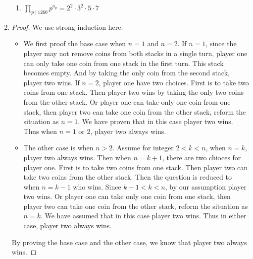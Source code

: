 \documentclass[11pt,a4paper]{article}
\begin{document}
\begin{enumerate}
\begin{enumerate}
			\item \( \prod\limits_{p \mid 1260} p^{a_{p}} = 2^2 \cdot 3^2 \cdot 5 \cdot 7\)
	 	\end{enumerate}

	\item \begin{proof} We use strong induction here.
		\begin{itemize}
			\item We first proof the base case when $n=1$ and $n=2$. If $n=1$, since the player may not remove coins from both stacks in a single turn, player one can only take one coin from one stack in the first turn. This stack becomes empty. And by taking the only coin from the second stack, player two wins. If $n=2$, player one have two choices. First is to take two coins from one stack. Then player two wins by taking the only two coins from the other stack. Or player one can take only one coin from one stack, then player two can take one coin from the other stack, reform the situation as $n=1$. We have proven that in this case player two wins. Thus when $n=1$ or $2$, player two always wins.
			\item The other case is when $n>2$. Assume for integer $2<k<n$, when $n=k$, player two always wins. Then when $n=k+1$, there are two chioces for player one. First is to take two coins from one stack. Then player two can take two coins from the other stack. Then the question is reduced to when $n=k-1$ who wins. Since $k-1<k<n$, by our assumption player two wins. Or player one can take only one coin from one stack, then player two can take one coin from the other stack, reform the situation as $n=k$. We have assumed that in this case player two wins. Thus in either case, player two always wins.
		\end{itemize} By proving the base case and the other case, we know that player two always wins. \end{proof}


\end{enumerate}
\end{document}
